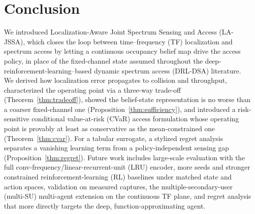 \section{Conclusion}
\label{sec:conclusion}

We introduced Localization-Aware Joint Spectrum Sensing and Access (LA-JSSA),
which closes the loop between time--frequency (TF) localization and
spectrum access by letting a continuous occupancy belief map drive the access
policy, in place of the fixed-channel state assumed throughout the
deep-reinforcement-learning--based dynamic spectrum access (DRL-DSA)
literature. We derived how localization error propagates to collision and
throughput, characterized the operating point via a three-way trade-off
(Theorem~\ref{thm:tradeoff}), showed the belief-state representation is no
worse than a coarser fixed-channel one (Proposition~\ref{thm:sufficiency}),
and introduced a risk-sensitive conditional value-at-risk (CVaR) access
formulation whose operating point is provably at least as conservative as the
mean-constrained one
(Theorem~\ref{thm:cvar}). For a tabular surrogate, a stylized regret analysis
separates a vanishing learning term from a policy-independent sensing gap
(Proposition~\ref{thm:regret}). Future work includes large-scale evaluation with
the full conv-frequency/linear-recurrent-unit (LRU) encoder, more seeds and
stronger constrained reinforcement-learning (RL) baselines under matched state
and action spaces, validation on measured captures, the
multiple-secondary-user (multi-SU) multi-agent extension on the continuous TF
plane, and
regret analysis that more directly targets the deep, function-approximating
agent.
